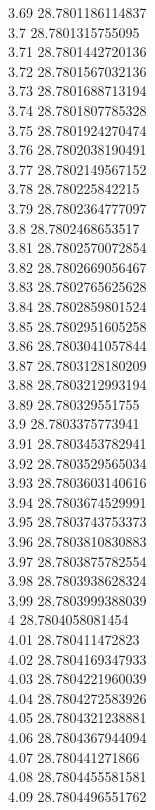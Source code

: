 {3.69	28.7801186114837\\
3.7	28.7801315755095\\
3.71	28.7801442720136\\
3.72	28.7801567032136\\
3.73	28.7801688713194\\
3.74	28.7801807785328\\
3.75	28.7801924270474\\
3.76	28.7802038190491\\
3.77	28.7802149567152\\
3.78	28.780225842215\\
3.79	28.7802364777097\\
3.8	28.7802468653517\\
3.81	28.7802570072854\\
3.82	28.7802669056467\\
3.83	28.7802765625628\\
3.84	28.7802859801524\\
3.85	28.7802951605258\\
3.86	28.7803041057844\\
3.87	28.7803128180209\\
3.88	28.7803212993194\\
3.89	28.780329551755\\
3.9	28.7803375773941\\
3.91	28.7803453782941\\
3.92	28.7803529565034\\
3.93	28.7803603140616\\
3.94	28.7803674529991\\
3.95	28.7803743753373\\
3.96	28.7803810830883\\
3.97	28.7803875782554\\
3.98	28.7803938628324\\
3.99	28.7803999388039\\
4	28.7804058081454\\
4.01	28.780411472823\\
4.02	28.7804169347933\\
4.03	28.7804221960039\\
4.04	28.7804272583926\\
4.05	28.7804321238881\\
4.06	28.7804367944094\\
4.07	28.780441271866\\
4.08	28.7804455581581\\
4.09	28.7804496551762\\
}
